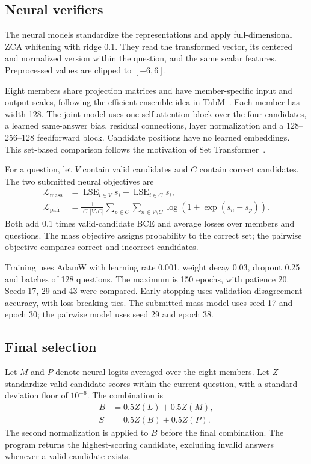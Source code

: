 \documentclass[11pt,a4paper]{article}
\newcommand{\lse}{\operatorname{LSE}}
\begin{document}
\subsection{Neural verifiers}

The neural models standardize the representations and apply full-dimensional ZCA whitening with ridge 0.1. They read the transformed vector, its centered and normalized version within the question, and the same scalar features. Preprocessed values are clipped to $[-6,6]$.

Eight members share projection matrices and have member-specific input and output scales, following the efficient-ensemble idea in TabM~\cite{tabm}. Each member has width 128. The joint model uses one self-attention block over the four candidates, a learned same-answer bias, residual connections, layer normalization and a 128--256--128 feedforward block. Candidate positions have no learned embeddings. This set-based comparison follows the motivation of Set Transformer~\cite{settransformer}.

For a question, let $V$ contain valid candidates and $C$ contain correct candidates. The two submitted neural objectives are
\begin{align*}
 \mathcal L_{\mathrm{mass}}
 &=\lse_{i\in V}s_i-\lse_{i\in C}s_i,\\
 \mathcal L_{\mathrm{pair}}
 &=\frac{1}{|C|\,|V\setminus C|}
   \sum_{p\in C}\sum_{n\in V\setminus C}
   \log\!\left(1+\exp(s_n-s_p)\right).
\end{align*}
Both add 0.1 times valid-candidate BCE and average losses over members and questions. The mass objective assigns probability to the correct set; the pairwise objective compares correct and incorrect candidates.

Training uses AdamW with learning rate 0.001, weight decay 0.03, dropout 0.25 and batches of 128 questions. The maximum is 150 epochs, with patience 20. Seeds 17, 29 and 43 were compared. Early stopping uses validation disagreement accuracy, with loss breaking ties. The submitted mass model uses seed 17 and epoch 30; the pairwise model uses seed 29 and epoch 38.

\subsection{Final selection}

Let $M$ and $P$ denote neural logits averaged over the eight members. Let $Z$ standardize valid candidate scores within the current question, with a standard-deviation floor of $10^{-6}$. The combination is
\begin{align*}
 B&=0.5Z(L)+0.5Z(M),\\
 S&=0.5Z(B)+0.5Z(P).
\end{align*}
The second normalization is applied to $B$ before the final combination. The program returns the highest-scoring candidate, excluding invalid answers whenever a valid candidate exists.
\end{document}

